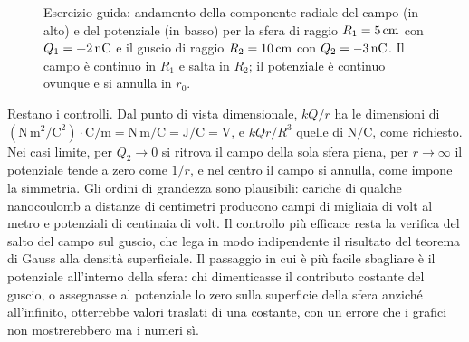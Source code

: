 \documentclass[11pt,a4paper]{article}
\begin{document}
\begin{figure}[htbp]
	\caption{Esercizio guida: andamento della componente radiale del campo (in alto) e del potenziale (in basso) per la sfera di raggio $R_1=5\,\mathrm{cm}$ con $Q_1=+2\,\mathrm{nC}$ e il guscio di raggio $R_2=10\,\mathrm{cm}$ con $Q_2=-3\,\mathrm{nC}$. Il campo è continuo in $R_1$ e salta in $R_2$; il potenziale è continuo ovunque e si annulla in $r_0$.}
	\label{fig:gauss:esercizio}
\end{figure}

Restano i controlli. Dal punto di vista dimensionale, $kQ/r$ ha le dimensioni di $(\mathrm{N\,m^2/C^2})\cdot\mathrm{C}/\mathrm{m}=\mathrm{N\,m/C}=\mathrm{J/C}=\mathrm{V}$, e $kQr/R^3$ quelle di $\mathrm{N/C}$, come richiesto. Nei casi limite, per $Q_2\to0$ si ritrova il campo della sola sfera piena, per $r\to\infty$ il potenziale tende a zero come $1/r$, e nel centro il campo si annulla, come impone la simmetria. Gli ordini di grandezza sono plausibili: cariche di qualche nanocoulomb a distanze di centimetri producono campi di migliaia di volt al metro e potenziali di centinaia di volt. Il controllo più efficace resta la verifica del salto del campo sul guscio, che lega in modo indipendente il risultato del teorema di Gauss alla densità superficiale. Il passaggio in cui è più facile sbagliare è il potenziale all'interno della sfera: chi dimenticasse il contributo costante del guscio, o assegnasse al potenziale lo zero sulla superficie della sfera anziché all'infinito, otterrebbe valori traslati di una costante, con un errore che i grafici non mostrerebbero ma i numeri sì.
\end{document}
